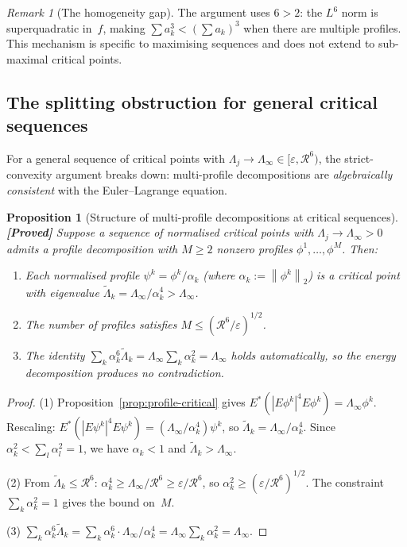 \documentclass[12pt]{article}
\newtheorem{proposition}[theorem]{Proposition}
\theoremstyle{definition}
\theoremstyle{remark}
\newtheorem{remark}[theorem]{Remark}
\newcommand{\norm}[1]{\left\|#1\right\|}
\newcommand{\proven}{\textbf{\color{teal}[Proved]}}
\begin{document}
\begin{remark}[The homogeneity gap]
  The argument uses $6>2$: the $L^6$ norm is superquadratic in~$f$,
  making $\sum a_k^3<(\sum a_k)^3$ when there are multiple profiles.
  This mechanism is specific to maximising sequences and does not
  extend to sub-maximal critical points.
\end{remark}

\subsection{The splitting obstruction for general critical sequences}

For a general sequence of critical points with
$\Lambda_j\to\Lambda_\infty\in[\varepsilon,\mathcal R^6)$, the
strict-convexity argument breaks down: multi-profile decompositions
are \emph{algebraically consistent} with the Euler--Lagrange equation.

\begin{proposition}[Structure of multi-profile decompositions at
  critical sequences]
  \label{prop:multi-profile}
  \proven\quad
  Suppose a sequence of normalised critical points with
  $\Lambda_j\to\Lambda_\infty>0$ admits a profile decomposition
  with $M\geq 2$ nonzero profiles $\phi^1,\ldots,\phi^M$.  Then:
  \begin{enumerate}[leftmargin=2em]
    \item Each normalised profile $\psi^k=\phi^k/\alpha_k$ (where
      $\alpha_k:=\norm{\phi^k}_2$) is a critical point with
      eigenvalue
      $\widetilde\Lambda_k=\Lambda_\infty/\alpha_k^4
      >\Lambda_\infty$.
    \item The number of profiles satisfies
      $M\leq(\mathcal R^6/\varepsilon)^{1/2}$.
    \item The identity $\sum_k\alpha_k^6\widetilde\Lambda_k
      =\Lambda_\infty\sum_k\alpha_k^2=\Lambda_\infty$ holds
      automatically, so the energy decomposition produces no
      contradiction.
  \end{enumerate}
\end{proposition}

\begin{proof}
  (1) Proposition~\ref{prop:profile-critical} gives
  $E^*(|E\phi^k|^4E\phi^k)=\Lambda_\infty\phi^k$.  Rescaling:
  $E^*(|E\psi^k|^4E\psi^k)=(\Lambda_\infty/\alpha_k^4)\psi^k$,
  so $\widetilde\Lambda_k=\Lambda_\infty/\alpha_k^4$.  Since
  $\alpha_k^2<\sum_l\alpha_l^2=1$, we have $\alpha_k<1$ and
  $\widetilde\Lambda_k>\Lambda_\infty$.

  (2) From $\widetilde\Lambda_k\leq\mathcal R^6$:
  $\alpha_k^4\geq\Lambda_\infty/\mathcal R^6
  \geq\varepsilon/\mathcal R^6$, so
  $\alpha_k^2\geq(\varepsilon/\mathcal R^6)^{1/2}$.  The constraint
  $\sum_k\alpha_k^2=1$ gives the bound on~$M$.

  (3) $\sum_k\alpha_k^6\widetilde\Lambda_k
  =\sum_k\alpha_k^6\cdot\Lambda_\infty/\alpha_k^4
  =\Lambda_\infty\sum_k\alpha_k^2=\Lambda_\infty$. \qedhere
\end{proof}
\end{document}
